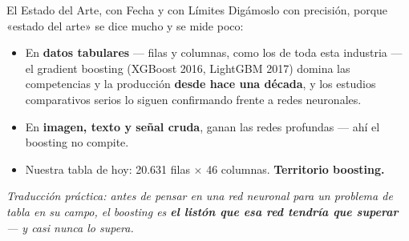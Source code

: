 \documentclass[aspectratio=169, 11pt]{beamer}
\begin{document}
\begin{frame}[shrink=8]{El Estado del Arte, con Fecha y con Límites}
  \vspace{2pt}
  {\footnotesize\color{textMuted}
  Digámoslo con precisión, porque «estado del arte» se dice mucho y se
  mide poco:}
  \vspace{7pt}
  {\footnotesize
    \begin{itemize}\setlength{\itemsep}{8pt}
    \item[{\color{codeGreen}\faCheck}]
      En \textbf{datos tabulares} --- filas y columnas, como los de toda
      esta industria --- el gradient boosting (XGBoost 2016, LightGBM
      2017) domina las competencias y la producción \textbf{desde hace
      una década}, y los estudios comparativos serios lo siguen
      confirmando frente a redes neuronales.
    \item[{\color{arcaRed}\faBan}]
      En \textbf{imagen, texto y señal cruda}, ganan las redes profundas
      --- ahí el boosting no compite.
    \item[{\color{codeGreen}\faCheck}]
      Nuestra tabla de hoy: 20.631 filas $\times$ 46 columnas.
      \textbf{Territorio boosting.}
    \end{itemize}}
  \vspace{7pt}
  \begin{tcolorbox}[colback=arcaGray, colframe=arcaDark, boxrule=0pt, leftrule=3pt,
    arc=3pt, left=8pt, right=8pt, top=5pt, bottom=5pt]
    {\footnotesize\color{arcaDark}\itshape
     Traducción práctica: antes de pensar en una red neuronal para un
     problema de tabla en su campo, el boosting es \textbf{el listón que
     esa red tendría que superar} --- y casi nunca lo supera.}
  \end{tcolorbox}
\end{frame}
\end{document}

